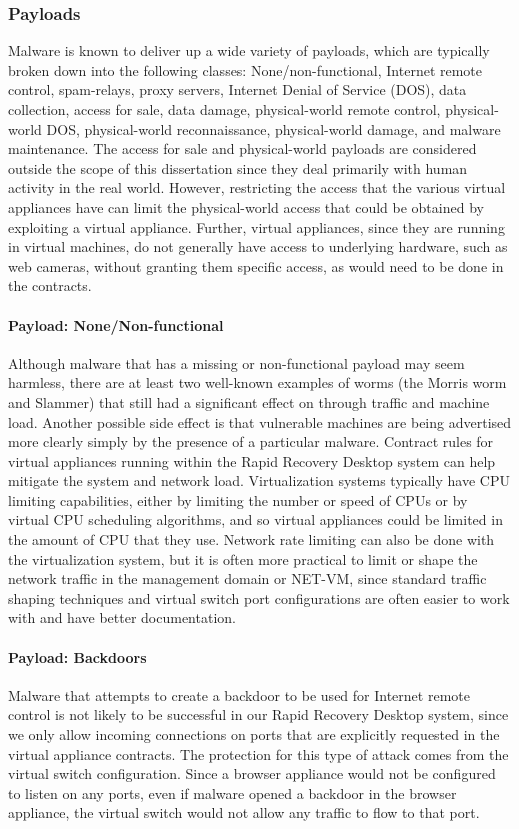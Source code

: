 \subsubsection{Payloads}
\label{sec:payloads}
Malware is known to deliver up a wide variety of payloads, which are typically broken down into the following classes: None/non-functional, Internet remote control, spam-relays, proxy servers, Internet Denial of Service (DOS), data collection, access for sale, data damage, physical-world remote control, physical-world DOS, physical-world reconnaissance, physical-world damage, and malware maintenance. The access for sale and physical-world payloads are considered outside the scope of this dissertation since they deal primarily with human activity in the real world. However, restricting the access that the various virtual appliances have can limit the physical-world access that could be obtained by exploiting a virtual appliance. Further, virtual appliances, since they are running in virtual machines, do not generally have access to underlying hardware, such as web cameras, without granting them specific access, as would need to be done in the contracts.

\paragraph{Payload: None/Non-functional}
Although malware that has a missing or non-functional payload may seem harmless, there are at least two well-known examples of worms (the Morris worm\cite{Spafford_1989} and Slammer\cite{slammer_2003}) that still had a significant effect on through traffic and machine load. Another possible side effect is that vulnerable machines are being advertised more clearly simply by the presence of a particular malware. Contract rules for virtual appliances running within the Rapid Recovery Desktop system can help mitigate the system and network load. Virtualization systems typically have CPU limiting capabilities, either by limiting the number or speed of CPUs or by virtual CPU scheduling algorithms, and so virtual appliances could be limited in the amount of CPU that they use. Network rate limiting can also be done with the virtualization system, but it is often more practical to limit or shape the network traffic in the management domain or NET-VM, since standard traffic shaping techniques and virtual switch port configurations are often easier to work with and have better documentation.

\paragraph{Payload: Backdoors}
Malware that attempts to create a backdoor to be used for Internet remote control is not likely to be successful in our Rapid Recovery Desktop system, since we only allow incoming connections on ports that are explicitly requested in the virtual appliance contracts. The protection for this type of attack comes from the virtual switch configuration. Since a browser appliance would not be configured to listen on any ports, even if malware opened a backdoor in the browser appliance, the virtual switch would not allow any traffic to flow to that port.

